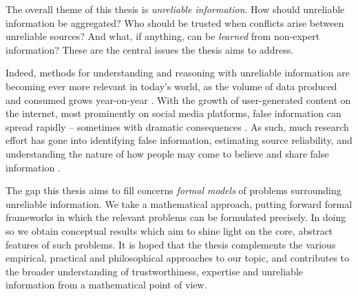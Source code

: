 
The overall theme of this thesis is \emph{unreliable information}. How should
unreliable information be aggregated? Who should be trusted when conflicts
arise between unreliable sources? And what, if anything, can be \emph{learned}
from non-expert information? These are the central issues the thesis aims to
address.

Indeed, methods for understanding and reasoning with unreliable information are
becoming ever more relevant in today's world, as the volume of data produced
and consumed grows year-on-year . With the growth of user-generated
content on the internet, most prominently on social media platforms, false
information can spread rapidly -- sometimes with dramatic
consequences . As such, much research effort has gone into identifying
false information, estimating source reliability, and understanding the nature
of how people may come to believe and share false information .

The gap this thesis aims to fill concerns \emph{formal models} of problems
surrounding unreliable information. We take a mathematical approach, putting
forward formal frameworks in which the relevant problems can be formulated
precisely. In doing so we obtain conceptual results which aim to shine light on
the core, abstract features of such problems. It is hoped that the thesis
complements the various empirical, practical and philosophical approaches
 to our topic, and contributes to the broader understanding of
trustworthiness, expertise and unreliable information from a mathematical point
of view.

